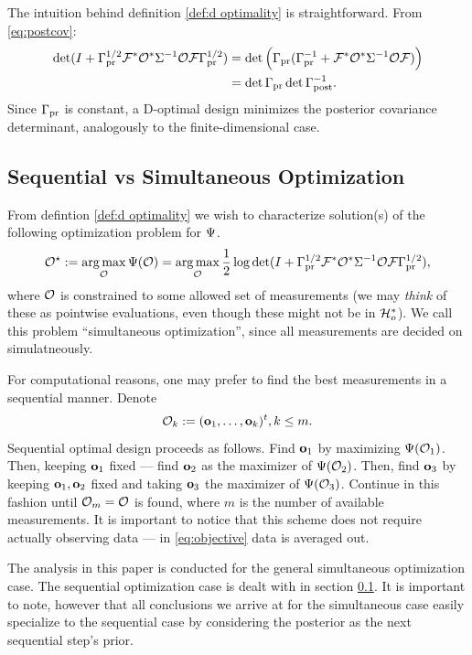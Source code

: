\documentclass{amsart}
\numberwithin{equation}{section}
\begin{document}
The intuition behind definition \ref{def:d optimality} is
straightforward. From \eqref{eq:postcov}:
\begin{align*}
  \begin{split}
    \det ( I + \Gamma_{\textup{pr}}^{1/2}  \mathcal{F} ^* \mathcal{O}^* \Sigma^{-1} \mathcal{O} \mathcal{F} \Gamma_{\textup{pr}}^{1/2}) &= \det \Big( \Gamma_{\textup{pr}} ( \Gamma_{\textup{pr}}^{-1} + \mathcal{F} ^* \mathcal{O}^* \Sigma^{-1} \mathcal{O} \mathcal{F}) \Big )\\
    &= \det \Gamma_{\textup{pr}} \det \Gamma_{\textup{post}}^{-1}.
  \end{split}
\end{align*}
Since $\Gamma_{\textup{pr}}$ is constant, a D-optimal design minimizes the posterior
covariance determinant, analogously to the finite-dimensional case.

\subsection{Sequential vs Simultaneous Optimization}\label{subsec:seq vs sim}
From defintion \ref{def:d optimality} we wish to characterize solution(s) of the
following optimization problem for $\Psi$. %
\begin{align}\label{eq:optimization}
  \mathcal{O}^{\star} := \operatorname*{arg\,max}_{\mathcal{O}} \Psi( \mathcal{O} ) 
  = \operatorname*{arg\,max}_{\mathcal{O}} \frac12 \log \det 
  (I + \Gamma_{\textup{pr}}^{1/2} \mathcal{F}^*\mathcal{O}^* \Sigma^{-1} \mathcal{O} \mathcal{F} \Gamma_{\textup{pr}}^{1/2}),
\end{align}
where $\mathcal{O}$ is constrained to some allowed set of measurements (we
may \textit{think} of these as pointwise evaluations, even though
these might not be in $\mathcal{H}_o^*$). We call this problem ``simultaneous
optimization'', since all measurements are decided on simulatneously.

For computational reasons, one may prefer to find the best
measurements in a sequential manner. Denote
\begin{equation}\label{eq:def obs_k}
  \mathcal{O}_k := (\mathbf{o}_1,\dots, \mathbf{o}_k)^t,  k\leq m.
\end{equation}
Sequential optimal design proceeds as follows. Find $\mathbf{o}_1$ by
maximizing $\Psi(\mathcal{O}_1)$. Then, keeping $\mathbf{o}_1$ fixed --- find
$\mathbf{o}_2$ as the maximizer of $\Psi(\mathcal{O}_2)$. Then, find $\mathbf{o}_3$ by
keeping $\mathbf{o}_1,\mathbf{o}_2$ fixed and taking $\mathbf{o}_3$ the maximizer of
$\Psi(\mathcal{O}_3)$. Continue in this fashion until $\mathcal{O}_m = \mathcal{O}$ is
found, where $m$ is the number of available measurements. It is
important to notice that this scheme does not require actually
observing data --- in \eqref{eq:objective} data is averaged out.

The analysis in this paper is conducted for the general simultaneous
optimization case. The sequential optimization case is dealt with in
section \ref{subsec:seq vs sim}. It is important to note, however that
all conclusions we arrive at for the simultaneous case easily
specialize to the sequential case by considering the posterior as the
next sequential step's prior.
\end{document}
